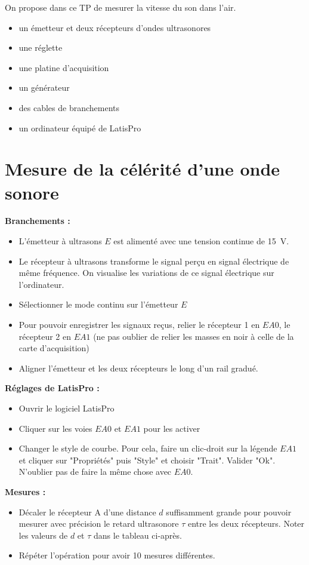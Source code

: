 \documentclass[a4paper,11pt,fleqn]{scrartcl}%
\begin{document}
	\maketitle
 On propose dans ce TP de mesurer la vitesse du son dans l'air.
\begin{materiel}
    \begin{itemize}
        \item un émetteur et deux récepteurs d'ondes ultrasonores
        \item une réglette
        \item une platine d'acquisition
        \item un générateur
        \item des cables de branchements
        \item un ordinateur équipé de LatisPro
    \end{itemize}
\end{materiel}

\section{Mesure de la célérité d'une onde sonore}
\begin{protocole}
    \textbf{Branchements : }
\begin{itemize}
    \item L'émetteur à ultrasons $E$ est alimenté avec une tension continue de \SI{15}{V}.
	\item Le récepteur à ultrasons transforme le signal perçu en signal électrique de même fréquence. On visualise les variations de ce signal électrique sur l'ordinateur.
	\item Sélectionner le mode continu sur l'émetteur $E$
	\item Pour pouvoir enregistrer les signaux reçus, relier le récepteur 1 en $EA0$, le récepteur 2 en $EA1$ (ne pas oublier de relier les masses en noir à celle de la carte d'acquisition)
	\item Aligner l'émetteur et les deux récepteurs le long d'un rail gradué.
\end{itemize}
    \textbf{Réglages de LatisPro : }
    \begin{itemize}
        \item Ouvrir le logiciel LatisPro
		\item Cliquer sur les voies $EA0$ et $EA1$ pour les activer
		\item Changer le style de courbe. Pour cela, faire un clic-droit sur la légende $EA1$ et cliquer sur "Propriétés" puis "Style" et choisir "Trait". Valider "Ok". N'oublier pas de faire la même chose avec $EA0$.
    \end{itemize}
    \textbf{Mesures : }
    \begin{itemize}
        \item Décaler  le récepteur A d'une distance $d$ suffisamment grande pour pouvoir mesurer avec précision le retard ultrasonore $\tau$ entre les deux récepteurs. Noter les valeurs de $d$ et $\tau$ dans le tableau ci-après.
        \item Répéter l'opération pour avoir 10 mesures différentes.
    \end{itemize}
\end{protocole}
\end{document}
